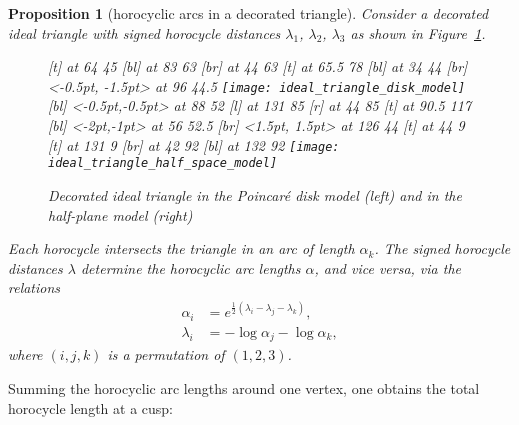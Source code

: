 \documentclass[a4paper, 11pt]{article}
\theoremstyle{plain}
\newtheorem{proposition}[theorem]{Proposition}
\theoremstyle{definition}
\begin{document}
\begin{proposition}[horocyclic arcs in a decorated triangle]
  \label{prop:arc}
  Consider a decorated ideal triangle with signed horocycle distances
  $\lambda_{1}$, $\lambda_{2}$, $\lambda_{3}$ as shown in
  Figure~\ref{fig:ideal_triang}.
  \begin{figure}
    \small\hair 2pt
     [t] at 64 45
     [bl] at 83 63
     [br] at 44 63
     [t] at 65.5 78
     [bl] at 34 44
     [br] <-0.5pt, -1.5pt> at 96 44.5
    \endlabellist
    \hfill
    \texttt{[image: ideal\_triangle\_disk\_model]}
    \small\hair 2pt
     [bl] <-0.5pt,-0.5pt> at 88 52
     [l] at 131 85
     [r] at 44 85
     [t] at 90.5 117
     [bl] <-2pt,-1pt> at 56 52.5
     [br] <1.5pt, 1.5pt> at 126 44
     [t] at 44 9
     [t] at 131 9
     [br] at 42 92
     [bl] at 132 92
    \endlabellist
    \hfill
    \texttt{[image: ideal\_triangle\_half\_space\_model]}
    \hspace*{\fill}
    \caption{Decorated ideal triangle in the Poincar{\'e} disk model (left) and
      in the half-plane model (right)}
    \label{fig:ideal_triang}
  \end{figure}
  Each horocycle intersects the triangle in an arc of length
  $\alpha_{k}$. The signed horocycle distances $\lambda$ determine the
  horocyclic arc lengths $\alpha$, and vice versa, via the relations
  \begin{align}
    \label{eq:alpha}
    \alpha_{i}&=e^{\frac{1}{2}(\lambda_{i}-\lambda_{j}-\lambda_{k})},\\
    \label{eq:lambdafromalpha}
    \lambda_{i}&=-\log\alpha_{j}-\log\alpha_{k},
  \end{align}
  where $(i,j,k)$ is a permutation of $(1,2,3)$.
\end{proposition}

Summing the horocyclic arc lengths around one vertex, one obtains the
total horocycle length at a cusp:
\end{document}
